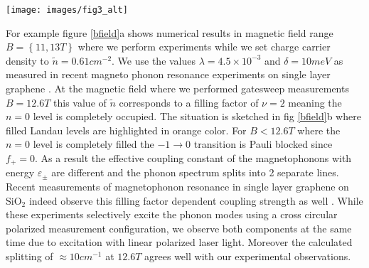 \documentclass[prl,aps,superscriptaddress,reprint]{revtex4-1}
\begin{document}
\begin{figure*}
    \texttt{[image: images/fig3\_alt]}
    \caption{\label{bfield} a) Numerical simulation of the magneto-phonon energy as a function of magnetic field strength $B=\left\lbrace 6T,15T \right\rbrace$ at density $\widetilde{n}=0.61\times 10^{12}cm^{-2}$ . Dashed vertical lines are placed at $\nu=2,4$. Red line: phonons coupling to the $\Delta\left|n\right|= + 1$ transitions. Blue line: phonons coupling to $\Delta\left|n\right|= - 1$ transitions. Orange line: Filling factor $\nu$ b)Schematic view of the Landau level spectrum at B=12.6T. Filled states are colored orange. The red and blue arrows show transitions allowed by the selection rule $\Delta\left|n\right|= \pm 1$. Dashed arrows mark Pauli blocked transitions. c)Raman gatesweep at $B=12.6T$. The energy of the G-Band was extracted from two-peak Lorentz fits to Raman spectra. Vertical orange lines where placed at $\nu=-6,-2,0,2,6$ where the n=-1,0,1 levels are completely filled/depleted with charge carriers ($\nu=0$ - half filling of n=0 level). Red and blue curve are calculated magneto-phonon energies according to equation \ref{greens}}
\end{figure*}
For example figure \ref{bfield}a shows numerical results in magnetic field range $B=\left\lbrace 11,13T \right\rbrace$ where we perform experiments while we set charge carrier density to $\widetilde{n}=0.61cm^{-2}$. We use the values $\lambda=4.5\times 10^{-3}$ and $\delta=10meV$ as measured in recent magneto phonon resonance experiments on single layer graphene \cite{kossacki2012circular}. At the magnetic field where we performed gatesweep measurements $B=12.6T$ this value of $\widetilde{n}$ corresponds to a filling factor of $\nu=2$ meaning the $n=0$ level is completely occupied. The situation is sketched in fig \ref{bfield}b where filled Landau levels are highlighted in orange color. For $B<12.6T$ where the $n=0$ level is completely filled the $-1\rightarrow 0$ transition is Pauli blocked since $f_{+}=0$. As a result the effective coupling constant of the magnetophonons with energy $\varepsilon_{\pm}$ are different and the phonon spectrum splits into 2 separate lines.
Recent measurements of magnetophonon resonance in single layer graphene on SiO$_2$ indeed observe this filling factor dependent coupling strength as well \cite{PhysRevLett.110.227402,kossacki2012circular}. While these experiments selectively excite the phonon modes using a cross circular polarized measurement configuration, we observe both components at the same time due to excitation with linear polarized laser light.
Moreover the calculated splitting of $\approx 10cm^{-1}$ at $12.6T$ agrees well with our experimental observations.
\end{document}

